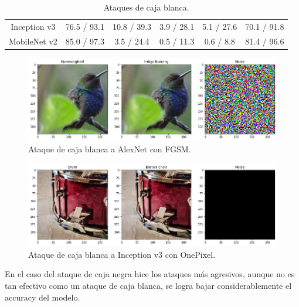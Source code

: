 \documentclass[10pt]{article}
\begin{document}
\begin{multicols*}{2}
\begin{table}[H]
{\begin{tabular}{@{}cccccc@{}}
			Inception v3    & 76.5 / 93.1                                                              & 10.8 / 39.3                                                            & 3.9 / 28.1                                                            & 5.1 / 27.6                                                               & 70.1 / 91.8                                                                \\
			MobileNet v2    & 85.0 / 97.3                                                              & 3.5 / 24.4                                                             & 0.5 / 11.3                                                            & 0.6 / 8.8                                                                & 81.4 / 96.6                                                                \\ \bottomrule
		\end{tabular}%
	}
	\caption{Ataques de caja blanca.}
\end{table}

\begin{figure}[H]
	\centering
	\includegraphics[width=0.99\linewidth]{Images/hummingbird_alexnet_FGSM.png}
	\caption{Ataque de caja blanca a AlexNet con FGSM.}
\end{figure}

\begin{figure}[H]
	\centering
	\includegraphics[width=0.99\linewidth]{Images/inception_v3_OnePixel.png}
	\caption{Ataque de caja blanca a Inception v3 con OnePixel.}
\end{figure}

En el caso del ataque de caja negra hice los ataques más agresivos, aunque no es tan efectivo como un ataque de caja blanca, se logra bajar considerablemente el accuracy del modelo.


\end{multicols*}
\end{document}
